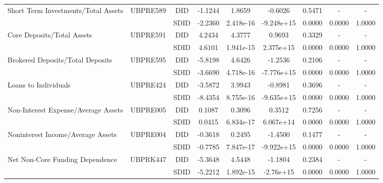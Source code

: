 \begin{table}[htbp]
\begin{tabular}{lcccccccc}
\hline
Short Term Investments/Total Assets & UBPRE589 & DID & -1.1244 & 1.8659 & -0.6026 & 0.5471 & - & - \\
 &  & SDID & -2.2360 & 2.418e-16 & -9.248e+15 & 0.0000 & 0.0000 & 1.0000 \\
\hline
Core Deposits/Total Assets & UBPRE591 & DID & 4.2434 & 4.3777 & 0.9693 & 0.3329 & - & - \\
 &  & SDID & 4.6101 & 1.941e-15 & 2.375e+15 & 0.0000 & 0.0000 & 1.0000 \\
\hline
Brokered Deposits/Total Deposits & UBPRE595 & DID & -5.8198 & 4.6426 & -1.2536 & 0.2106 & - & - \\
 &  & SDID & -3.6690 & 4.718e-16 & -7.776e+15 & 0.0000 & 0.0000 & 1.0000 \\
\hline
Loans to Individuals & UBPRE424 & DID & -3.5872 & 3.9943 & -0.8981 & 0.3696 & - & - \\
 &  & SDID & -8.4354 & 8.755e-16 & -9.635e+15 & 0.0000 & 0.0000 & 1.0000 \\
\hline
Non-Interest Expense/Average Assets & UBPRE005 & DID & 0.1087 & 0.3096 & 0.3512 & 0.7256 & - & - \\
 &  & SDID & 0.0415 & 6.834e-17 & 6.067e+14 & 0.0000 & 0.0000 & 1.0000 \\
\hline
Noninterest Income/Average Assets & UBPRE004 & DID & -0.3618 & 0.2495 & -1.4500 & 0.1477 & - & - \\
 &  & SDID & -0.7785 & 7.847e-17 & -9.922e+15 & 0.0000 & 0.0000 & 1.0000 \\
\hline
Net Non-Core Funding Dependence & UBPRK447 & DID & -5.3648 & 4.5448 & -1.1804 & 0.2384 & - & - \\
 &  & SDID & -5.2212 & 1.892e-15 & -2.76e+15 & 0.0000 & 0.0000 & 1.0000 \\
\hline
\end{tabular}
\end{table} 